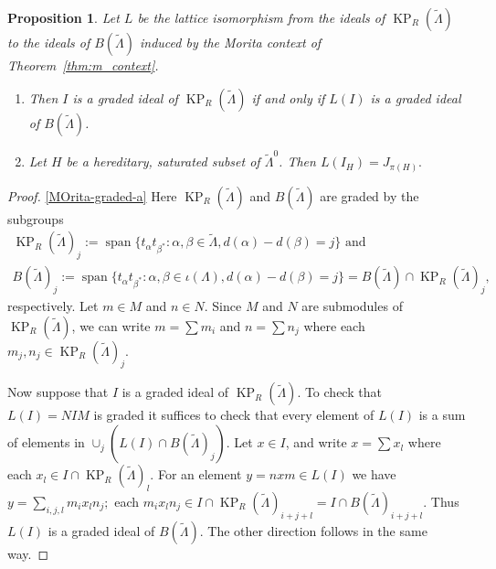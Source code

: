 \documentclass[a4paper,12pt]{amsart}
\numberwithin{equation}{section}
\newtheorem{prop}[thm]{Proposition}
\theoremstyle{definition}
\theoremstyle{remark}
\begin{document}
\begin{prop}\label{MOrita-graded}  
Let  $L$ be 
the lattice isomorphism from the ideals of $\operatorname{KP}_R({\tilde{\Lambda}})$ to the ideals of 
$B(\tilde\Lambda)$ induced by the Morita context of   Theorem~\ref{thm:m_context}. 
\begin{enumerate} \item\label{MOrita-graded-a} Then $I$ is a graded ideal of $\operatorname{KP}_R({\tilde{\Lambda}})$ if and only if $L(I)$ is a graded ideal of  $B(\tilde\Lambda)$.
\item\label{MOrita-graded-b} Let $H$ be a hereditary, saturated subset of ${\tilde{\Lambda}}^0$. Then
$L(I_H)=J_{\pi(H)}.$
\end{enumerate}
\end{prop}
\begin{proof}
\eqref{MOrita-graded-a} Here $\operatorname{KP}_R(\tilde\Lambda)$ and $B({\tilde{\Lambda}})$ are graded by the subgroups
\begin{gather*}\operatorname{KP}_R(\tilde\Lambda)_j:= {\operatorname{\mathrm{span}}}\{t_\alpha t_{\beta^{*}}: \alpha,\beta\in{\tilde{\Lambda}}, d(\alpha)-d(\beta)=j\}\text{\ and }\\
B({\tilde{\Lambda}})_j:= {\operatorname{\mathrm{span}}}\{t_\alpha t_{\beta^{*}}: \alpha,\beta\in\iota(\Lambda), d(\alpha)-d(\beta)=j\}=B({\tilde{\Lambda}})\cap \operatorname{KP}_R(\tilde\Lambda)_j,
\end{gather*}
respectively. Let  $m\in M$ and $n\in N$. Since $M$ and $N$ are submodules of $\operatorname{KP}_R(\tilde\Lambda)$,  we can write  $m=\sum m_i$ and $n=\sum n_j$ where each $m_j, n_j\in \operatorname{KP}_R(\tilde\Lambda)_j$.  

Now suppose that $I$ is a graded ideal of $\operatorname{KP}_R(\tilde\Lambda)$.  To check that $L(I)=NIM$ is graded it suffices to check that every element of $L(I)$ is a sum of elements in $\cup_j(L(I)\cap B({\tilde{\Lambda}})_j)$. Let $x\in I$, and write $x=\sum x_l$ where each $x_l\in I\cap \operatorname{KP}_R(\tilde\Lambda)_l$.  For an  element $y=nxm\in L(I)$ we have
$
y=\sum_{i,j,l} m_ix_ln_j;
$
each $m_ix_ln_j\in I\cap \operatorname{KP}_R(\tilde\Lambda)_{i+j+l}= I\cap B({\tilde{\Lambda}})_{i+j+l}$. Thus $L(I)$ is a graded ideal of $B({\tilde{\Lambda}})$.  The other direction follows in the same way.


\end{proof}
\end{document}
